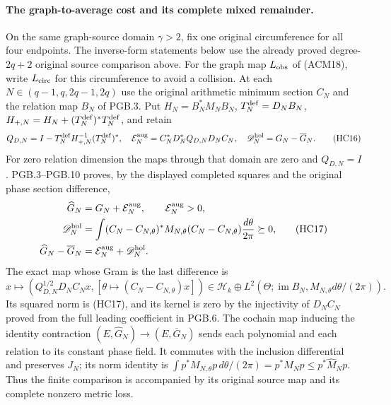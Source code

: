 \paragraph{The graph-to-average cost and its complete mixed remainder.}
On the same graph-source domain $\gamma>2$, fix one original
circumference for all four endpoints. The inverse-form statements
below use the already proved degree-$2q+2$ original source
comparison above. For the graph map $L_{\rm obs}$ of (ACM18),
write $L_{\rm circ}$ for this circumference to avoid a collision.
At each $N\in(q-1,q,2q-1,2q)$ use the original arithmetic
minimum section $C_N$ and the relation map $B_N$ of PGB.3.
Put $H_N=B_N^*M_NB_N$, $T_N^{\rm def}=D_NB_N$,
$H_{+,N}=H_N+(T_N^{\rm def})^*T_N^{\rm def}$, and retain
\[
 Q_{D,N}=I-T_N^{\rm def}H_{+,N}^{-1}(T_N^{\rm def})^*,
 \quad
 \mathcal E_N^{\rm aug}=C_N^*D_N^*Q_{D,N}D_NC_N,
 \quad
 \mathscr D_N^{\rm hol}=G_N-\overline G_N.
 \tag{HC16}
\]
For zero relation dimension the maps through that domain are
zero and $Q_{D,N}=I$. PGB.3--PGB.10 proves, by the displayed
completed squares and the original phase section difference,
\[
 \begin{aligned}
 \widehat G_N&=G_N+\mathcal E_N^{\rm aug},\qquad
 \mathcal E_N^{\rm aug}>0,\\
 \mathscr D_N^{\rm hol}
 &=\int(C_N-C_{N,\theta})^*M_{N,\theta}
                     (C_N-C_{N,\theta})\frac{d\theta}{2\pi}
 \succeq0,\\
 \widehat G_N-\overline G_N&=
      \mathcal E_N^{\rm aug}+\mathscr D_N^{\rm hol}.
 \end{aligned}
 \tag{HC17}
\]
The exact map whose Gram is the last difference is
\[
 x\longmapsto\left(Q_{D,N}^{1/2}D_NC_Nx,
           [\theta\mapsto(C_N-C_{N,\theta})x]\right)
 \in\mathscr H_k\oplus
 L^2(\Theta;\operatorname{im}B_N,M_{N,\theta}d\theta/(2\pi)).
 \tag{HC18}
\]
Its squared norm is (HC17), and its kernel is zero by the
injectivity of $D_NC_N$ proved from the full leading coefficient
in PGB.6. The cochain map inducing the identity contraction
$(E,\widehat G_N)\to(E,\overline G_N)$ sends each polynomial
and each relation to its constant phase field. It commutes
with the inclusion differential and preserves $J_N$; its
norm identity is $\int p^*M_{N,\theta}p\,d\theta/(2\pi)
=p^*M_Np\leq p^*\widehat M_Np$.
Thus the finite comparison is accompanied by its original
source map and its complete nonzero metric loss.

